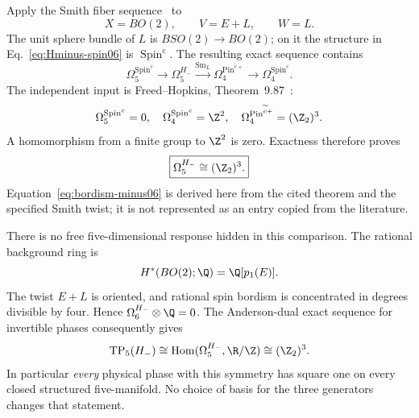 Apply the Smith fiber sequence~\cite[Theorem~5.1 and Corollary~5.8]{SmithFiber} to
\begin{equation}
 X=BO(2),\qquad V=E+L,\qquad W=L.
\end{equation}
The unit sphere bundle of $L$ is $BSO(2)\to BO(2)$; on it the structure in Eq.~\eqref{eq:Hminus-spin06} is $\operatorname{Spin}^c$. The resulting exact sequence contains
\begin{equation}\label{eq:smith-minus06}
 \Omega_5^{\operatorname{Spin}^c}\longrightarrow
 \Omega_5^{H_-}\xrightarrow{\mathrm{Sm}_L}
 \Omega_4^{\operatorname{Pin}^{\widetilde c+}}\longrightarrow
 \Omega_4^{\operatorname{Spin}^c}.
\end{equation}
The independent input is Freed--Hopkins, Theorem~9.87~\cite{FreedHopkins}:
\begin{equation}
 \Omega_5^{\operatorname{Spin}^c}=0,\quad
 \Omega_4^{\operatorname{Spin}^c}=\Z^2,\quad
 \Omega_4^{\operatorname{Pin}^{\widetilde c+}}=(\Z_2)^3.
\end{equation}
A homomorphism from a finite group to $\Z^2$ is zero. Exactness therefore proves
\begin{equation}\label{eq:bordism-minus06}
                   \boxed{\Omega_5^{H_-}\cong(\Z_2)^3.}
\end{equation}
Equation~\eqref{eq:bordism-minus06} is derived here from the cited theorem and the specified Smith twist; it is not represented as an entry copied from the literature.

There is no free five-dimensional response hidden in this comparison. The rational background ring is
\begin{equation*}
             H^*(BO(2);\Q)=\Q[p_1(E)].
\end{equation*}
The twist $E+L$ is oriented, and rational spin bordism is concentrated in degrees divisible by four. Hence $\Omega_6^{H_-}\otimes\Q=0$. The Anderson-dual exact sequence for invertible phases consequently gives
\begin{equation}
     \operatorname{TP}_5(H_-)
       \cong\operatorname{Hom}(\Omega_5^{H_-},\R/\Z)
       \cong(\Z_2)^3.
\end{equation}
In particular \emph{every} physical phase with this symmetry has square one on every closed structured five-manifold. No choice of basis for the three generators changes that statement.



